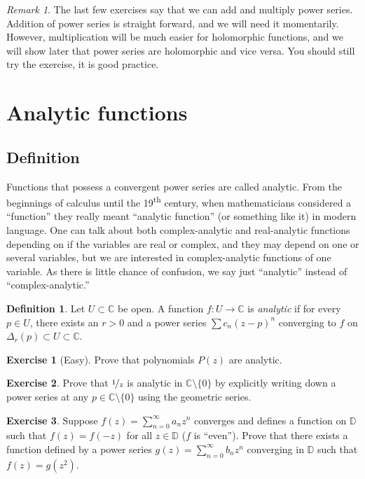 \documentclass[12pt,openany]{book}
\newcommand{\C}{{\mathbb{C}}}
\newcommand{\D}{{\mathbb{D}}}
\newcommand{\myindex}[1]{#1\index{#1}}
\newcommand{\myquote}[1]{``#1''}
\theoremstyle{plain}
\theoremstyle{remark}
\newtheorem{remark}[thm]{Remark}
\theoremstyle{definition}
\newtheorem{defn}[thm]{Definition}
\newenvironment{exbox}{%
    \def\FrameCommand{\vrule width 1pt \relax\hspace{10pt}}%
    \MakeFramed{\advance\hsize-\width\FrameRestore}%
}{%
    \endMakeFramed
}
\theoremstyle{exercise}
\newtheorem{exercise}{Exercise}[section]
\theoremstyle{example}
\begin{document}
\begin{remark}
The last few exercises say that we can add and multiply power series.
Addition of power series is straight forward, and we will need it momentarily.
However, multiplication will be much easier for
holomorphic functions, and we will show later that power series are
holomorphic and vice versa.  You should still try the exercise, it is good
practice.
\end{remark}


\section{Analytic functions}
\label{sec:analfuncs}

\subsection{Definition}

Functions that possess a convergent power series are called analytic.
From the beginnings of calculus until the 19\textsuperscript{th} century, 
when mathematicians considered a \myquote{function} they really meant
\myquote{analytic function} (or something like it) in modern language.
One can talk about
both complex-analytic and real-analytic functions depending on if the
variables are real or complex, and they may depend on one or several variables,
but we are interested in complex-analytic functions of one variable. 
As there is little chance of confusion, we say just \myquote{analytic} instead of
\myquote{complex-analytic.}

\begin{defn}
Let $U \subset \C$ be open.  A function $f \colon U \to \C$
is \emph{\myindex{analytic}}
if for every $p \in U$, there exists 
an $r > 0$ and a
power series $\sum c_n {(z-p)}^n$ converging to $f$ on $\Delta_r(p) \subset
U \subset \C$.
\end{defn}

\begin{exbox}
\begin{exercise}[Easy]
Prove that polynomials $P(z)$ are analytic.
\end{exercise}

\begin{exercise}
Prove that $\nicefrac{1}{z}$ is analytic in $\C \setminus \{ 0 \}$
by explicitly writing down 
a power series at any $p \in \C \setminus \{ 0 \}$
using the geometric series.
\end{exercise}

\begin{exercise}
Suppose $f(z) = \sum_{n=0}^\infty a_n z^n$ converges and defines a
function on $\D$ such that $f(z) = f(-z)$ for all $z \in \D$ ($f$ is
\myquote{even}).
Prove that there exists a function defined by a power series
$g(z) = \sum_{n=0}^\infty b_n z^n$ converging in $\D$ such that
$f(z) = g(z^2)$.
\end{exercise}
\end{exbox}
\end{document}
